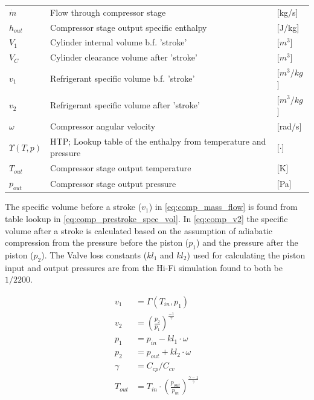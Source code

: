 \begin{center}
	\begin{tabular}{l p{10cm} l}
		$\dot{m}$       & Flow through compressor stage                                   & [\si{kg}/\si{s}]     \\
		$h_{out}$       & Compressor stage output specific enthalpy                       & [\si{J}/\si{kg}]     \\
		$V_1$           & Cylinder internal volume b.f. 'stroke'                          & [$\si{m}^3$]         \\
		$V_C$           & Cylinder clearance volume after 'stroke'                        & [$\si{m}^3$]         \\
		$v_1$           & Refrigerant specific volume b.f. 'stroke'                       & [$\si{m}^3/\si{kg}$] \\
		$v_2$           & Refrigerant specific volume after 'stroke'                      & [$\si{m}^3/\si{kg}$] \\
		$\omega$        & Compressor angular velocity                                     & [\si{rad}/\si{s}]    \\
		$\Upsilon(T,p)$ & HTP; Lookup table of the enthalpy from temperature and pressure & [$\cdot$]            \\
		$T_{out}$       & Compressor stage output temperature                             & [\si{K}]             \\
		$p_{out}$       & Compressor stage output pressure                                & [\si{Pa}]
	\end{tabular}
\end{center}

The specific volume before a stroke ($v_1$) in \cref{eq:comp_mass_flow} is found from table lookup in \cref{eq:comp_prestroke_spec_vol}. In \cref{eq:comp_v2} the specific volume after a stroke is calculated based on the assumption of adiabatic compression from the pressure before the piston ($p_1$) and the pressure after the piston ($p_2$). The Valve loss constants ($kl_1$ and $kl_2$) used for calculating the piston input and output pressures are from the Hi-Fi simulation found to both be $1/2200$.

\begin{align}
	v_1     & = \Gamma(T_{in},p_{1}) \label{eq:comp_prestroke_spec_vol}                   \\
	v_2     & = \left(\frac{p_2}{p_1}\right)^{\frac{-1}{\gamma}} \label{eq:comp_v2}                         \\
	p_1     & = p_{in} - kl_1 \cdot \omega \label{eq:comp_p1}                                               \\
	p_2     & = p_{out} + kl_2 \cdot \omega \label{eq:comp_p2}                                              \\
	\gamma  & = C_{cp}/C_{cv} \label{eq:comp_gamma}                                                            \\
	T_{out} & = T_{in}\cdot \left(\frac{p_{out}}{p_{in}}\right)^{\frac{\gamma-1}{\gamma}} \label{eq:comp_Tout}
\end{align}

